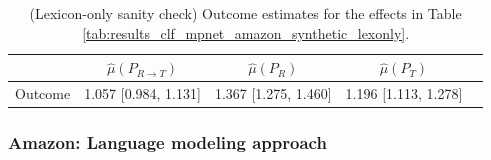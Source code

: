 \documentclass{article}
\begin{document}
\begin{table}[!ht]
\centering
\begin{tabular}{c|cccc}
\toprule
    & $\hat{\mu}(P_{R \rightarrow T})$   & $\hat{\mu}(P_R)$     & $\hat{\mu}(P_T)$     \\
\midrule
    Outcome & 1.057 [0.984, 1.131]               & 1.367 [1.275, 1.460] & 1.196 [1.113, 1.278] \\
\bottomrule
\end{tabular}
\caption{(Lexicon-only sanity check) Outcome estimates for the effects in Table \ref{tab:results_clf_mpnet_amazon_synthetic_lexonly}.}
\label{tab:results_clf_mpnet_amazon_synthetic_lexonly_dr_outcome}
\end{table}

\newpage
\subsubsection{Amazon: Language modeling approach}
\end{document}
